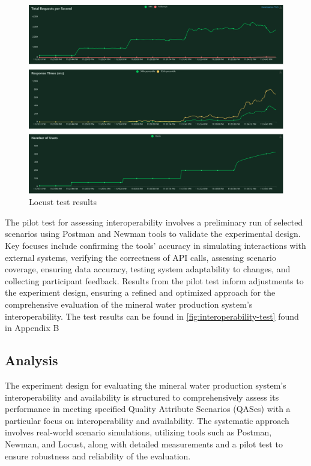 \documentclass[conference]{IEEEtran}
\begin{document}
\begin{figure}[H]
    \centering
    \includegraphics[width=1\linewidth]{images/total_requests_per_second_1702247160.png}
    \caption{Locust test results}
    \label{fig:locust-test}
\end{figure}

The pilot test for assessing interoperability involves a preliminary run of selected scenarios using Postman and Newman tools to validate the experimental design. Key focuses include confirming the tools' accuracy in simulating interactions with external systems, verifying the correctness of API calls, assessing scenario coverage, ensuring data accuracy, testing system adaptability to changes, and collecting participant feedback. Results from the pilot test inform adjustments to the experiment design, ensuring a refined and optimized approach for the comprehensive evaluation of the mineral water production system's interoperability. The test results can be found in \ref{fig:interoperability-test} found in Appendix B

\subsection{Analysis}
\label{sec:analysis}

The experiment design for evaluating the mineral water production system's interoperability and availability is structured to comprehensively assess its performance in meeting specified Quality Attribute Scenarios (QASes) with a particular focus on interoperability and availability. The systematic approach involves real-world scenario simulations, utilizing tools such as Postman, Newman, and Locust, along with detailed measurements and a pilot test to ensure robustness and reliability of the evaluation.
\end{document}
